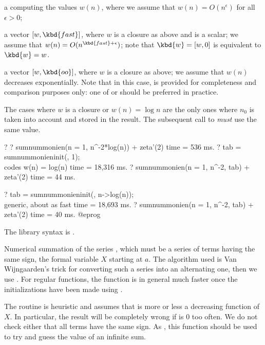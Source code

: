 \item a  computing the values $w(n)$, where we
assume that $w(n) = O(n^\epsilon)$ for all $\epsilon > 0$;

\item a vector $[w, \kbd{fast}]$, where $w$ is a closure as above
and  is a scalar;
we assume that $w(n) = O(n^{\kbd{fast}+\epsilon})$; note that
$\kbd{w} = [w, 0]$ is equivalent to $\kbd{w} = w$.

\item a vector $[w, \kbd{oo}]$, where $w$ is a closure as above;
we assume that $w(n)$ decreases exponentially. Note that in this case,
 is provided for completeness and comparison purposes only:
one of  or  should be preferred in practice.

The cases where $w$ is a closure or $w(n) = \log n$ are the only ones where
$n_0$ is taken into account and stored in the result. The subsequent call to
 \emph{must} use the same value.

\bprog
? 
? sumnummonien(n = 1, n^-2*log(n)) + zeta'(2)
time = 536 ms.
? tab = sumnummonieninit(, 1); \\ codes w(n) = log(n)
time = 18,316 ms.
? sumnummonien(n = 1, n^-2, tab) + zeta'(2)
time = 44 ms.

? tab = sumnummonieninit(, n->log(n)); \\ generic, about as fast
time = 18,693 ms.
? sumnummonien(n = 1, n^-2, tab) + zeta'(2)
time = 40 ms.
@eprog

The library syntax is .

\label{se:sumpos}
Numerical summation of the series , which must be a series of
terms having the same sign, the formal variable $X$ starting at $a$. The
algorithm used is Van Wijngaarden's trick for converting such a series into
an alternating one, then we use . For regular functions, the
function  is in general much faster once the initializations
have been made using .

The routine is heuristic and assumes that  is more or less a
decreasing function of $X$. In particular, the result will be completely
wrong if  is 0 too often. We do not check either that all terms
have the same sign. As , this function should be used to
try and guess the value of an infinite sum.


